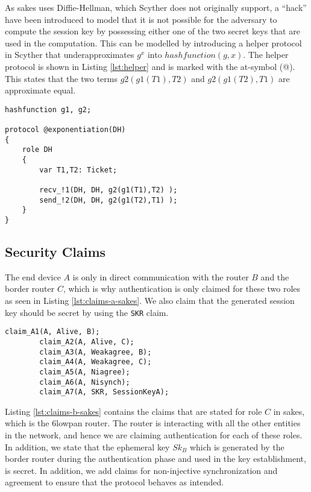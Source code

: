 As \gls{sakes} uses Diffie-Hellman, which Scyther does not originally support, a ``hack'' have been introduced to model that it is not possible for the adversary to compute the session key by possessing either one of the two secret keys that are used in the computation. This can be modelled by introducing a helper protocol in Scyther that underapproximates $g^{x}$ into $hashfunction(g, x)$. The helper protocol is shown in Listing \ref{lst:helper} and is marked with the at-symbol (@). This states that the two terms $g2(g1(T1),T2)$ and $g2(g1(T2), T1)$ are approximate equal.

\begin{lstlisting}[caption={Helper protocol to model Diffie-Hellman in SAKES.}, label={lst:helper}]
hashfunction g1, g2;

protocol @exponentiation(DH)
{
	role DH
	{
		var T1,T2: Ticket;

		recv_!1(DH, DH, g2(g1(T1),T2) );
		send_!2(DH, DH, g2(g1(T2),T1) );
	}
}
\end{lstlisting}

\subsection{Security Claims}

The end device $A$ is only in direct communication with the router $B$ and the border router $C$, which is why authentication is only claimed for these two roles as seen in Listing \ref{lst:claims-a-sakes}. We also claim that the generated session key should be secret by using the \texttt{SKR} claim. 

\begin{lstlisting}[caption={Security claims for role A in SAKES.}, label={lst:claims-a-sakes}]
		claim_A1(A, Alive, B);
		claim_A2(A, Alive, C);
		claim_A3(A, Weakagree, B);
		claim_A4(A, Weakagree, C);
		claim_A5(A, Niagree);
		claim_A6(A, Nisynch);
		claim_A7(A, SKR, SessionKeyA);
\end{lstlisting}


Listing \ref{lst:claims-b-sakes} contains the claims that are stated for role $C$ in \gls{sakes}, which is the \gls{6lowpan} router. The router is interacting with all the other entities in the network, and hence we are claiming authentication for each of these roles. In addition, we state that the ephemeral key $Sk_B$ which is generated by the border router during the authentication phase and used in the key establishment, is secret. In addition, we add claims for non-injective synchronization and agreement to ensure that the protocol behaves as intended.


